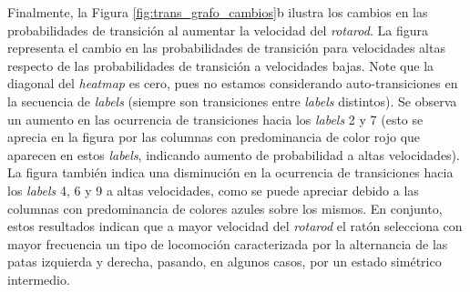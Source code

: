 Finalmente, la Figura \ref{fig:trans_grafo_cambios}b ilustra los cambios en las probabilidades de transición al aumentar la velocidad del \textit{rotarod}. La figura representa el cambio en las probabilidades de transición para velocidades altas respecto de las probabilidades de transición a velocidades bajas. Note que la diagonal del \textit{heatmap} es cero, pues no estamos considerando auto-transiciones en la secuencia de \textit{labels} (siempre son transiciones entre \textit{labels} distintos). Se observa un aumento en las ocurrencia de transiciones hacia los \textit{labels} 2 y 7 (esto se aprecia en la figura por las columnas con predominancia de color rojo que aparecen en estos \textit{labels}, indicando aumento de probabilidad a altas velocidades). La figura también indica una disminución en la ocurrencia de transiciones hacia los \textit{labels} 4, 6 y 9 a altas velocidades, como se puede apreciar debido a las columnas con predominancia de colores azules sobre los mismos.
En conjunto, estos resultados indican que a mayor velocidad del \textit{rotarod} el ratón selecciona con mayor frecuencia un tipo de locomoción caracterizada por la alternancia de las patas izquierda y derecha, pasando, en algunos casos, por un estado simétrico intermedio.  

